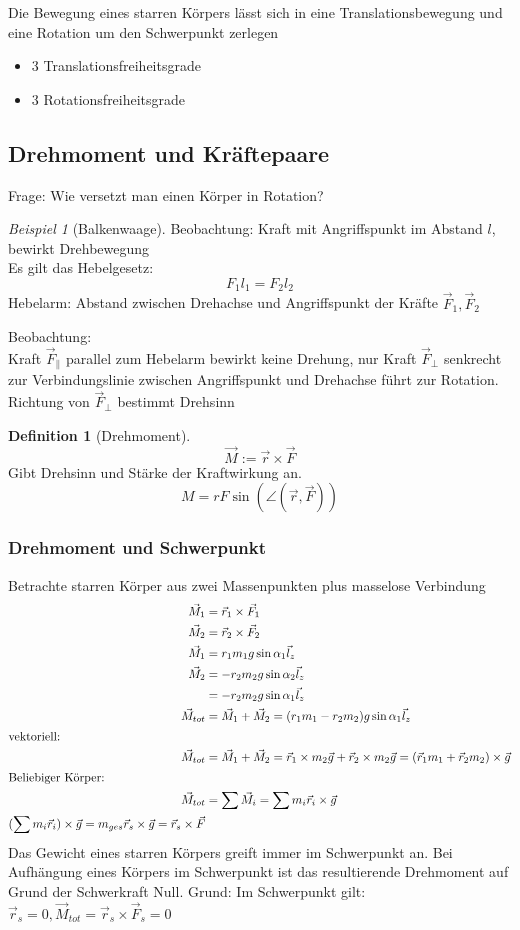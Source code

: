\documentclass[a4paper]{scrartcl}
\renewcommand{\v}[1]{\vec{#1}}
\theoremstyle{definition}
\newtheorem{defn}{Definition}
\theoremstyle{plain}
\theoremstyle{plain}
\theoremstyle{remark}
\theoremstyle{remark}
\theoremstyle{remark}
\newtheorem{ex}{Beispiel}
\begin{document}
Die Bewegung eines starren Körpers lässt sich in eine Translationsbewegung und eine Rotation um den Schwerpunkt zerlegen
\begin{itemize}
\item 3 Translationsfreiheitsgrade
\item 3 Rotationsfreiheitsgrade
\end{itemize}
\subsection{Drehmoment und Kräftepaare}
\label{sec-8-2}
Frage: Wie versetzt man einen Körper in Rotation? \\
\begin{ex}[Balkenwaage]
Beobachtung: Kraft mit Angriffspunkt im Abstand $l$, bewirkt Drehbewegung \\
   Es gilt das Hebelgesetz:
\[F_1 l_1 = F_2 l_2\]
Hebelarm: Abstand zwischen Drehachse und Angriffspunkt der Kräfte $\v F_1, \v F_2$
\end{ex}
Beobachtung: \\
   Kraft $\v F_\parallel$ parallel zum Hebelarm bewirkt keine Drehung, nur Kraft $\v F_\perp$ senkrecht zur Verbindungslinie zwischen Angriffspunkt und Drehachse führt zur Rotation. \\
   Richtung von $\v F_\perp$ bestimmt Drehsinn

\begin{defn}[Drehmoment]
\[\v M := \v r \times \v F\]
Gibt Drehsinn und Stärke der Kraftwirkung an.
\[M = r F \sin(\angle (\v r, \v F))\]
\end{defn}
\subsubsection{Drehmoment und Schwerpunkt}
\label{sec-8-2-1}
Betrachte starren Körper aus zwei Massenpunkten plus masselose Verbindung
\begin{align*}
\v M_1 &= \v r_1 \times \v F_1 \\
\v M_2 &= \v r_2 \times \v F_2 \\
\v M_1 &= r_1 m_1 g \sin{\alpha_1} \v l_z \\
\v M_2 &= - r_2 m_2 g \sin{\alpha_2} \v l_z \\
&= -r_2 m_2 g \sin{\alpha_1} \v l_z \\
\v M_{tot} &= \v M_1 + \v M_2 = (r_1 m_1 - r_2 m_2) g \sin{\alpha_1} \v l_z \\
\intertext{vektoriell:}
\v M_{tot} &= \v M_1 + \v M_2 = \v r_1 \times m_2 \v g + \v r_2 \times m_2 \v g = (\v r_1 m_1 + \v r_2 m_2) \times \v g \\
\intertext{Beliebiger Körper:}
\v M_{tot} &= \sum \v M_i = \sum m_i \v r_i \times \v g \\
(\sum m_i \v r_i) \times \v g = m_{ges} \v r_s \times \v g = \v r_s \times \v F \\
\end{align*}
Das Gewicht eines starren Körpers greift immer im Schwerpunkt an.
Bei Aufhängung eines Körpers im Schwerpunkt ist das resultierende Drehmoment auf Grund der Schwerkraft Null. Grund: Im Schwerpunkt gilt: $\v r_s = 0, \v M_{tot} = \v r_s \times \v F_s = 0$
\end{document}
